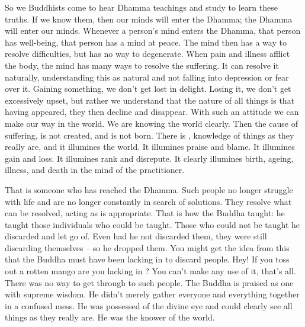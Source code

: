 So we Buddhists come to hear Dhamma teachings and study to learn these truths. If we know them, then our minds will enter the Dhamma; the Dhamma will enter our minds. Whenever a person's mind enters the Dhamma, that person has well-being, that person has a mind at peace. The mind then has a way to resolve difficulties, but has no way to degenerate. When pain and illness afflict the body, the mind has many ways to resolve the suffering. It can resolve it naturally, understanding this as natural and not falling into depression or fear over it. Gaining something, we don't get lost in delight. Losing it, we don't get excessively upset, but rather we understand that the nature of all things is that having appeared, they then decline and disappear. With such an attitude we can make our way in the world. We are  knowing the world clearly. Then  the cause of suffering, is not created, and  is not born. There is , knowledge of things as they really are, and it illumines the world. It illumines praise and blame. It illumines gain and loss. It illumines rank and disrepute. It clearly illumines birth, ageing, illness, and death in the mind of the practitioner. 

That is someone who has reached the Dhamma. Such people no longer struggle with life and are no longer constantly in search of solutions. They resolve what can be resolved, acting as is appropriate. That is how the Buddha taught: he taught those individuals who could be taught. Those who could not be taught he discarded and let go of. Even had he not discarded them, they were still discarding themselves -- so he dropped them. You might get the idea from this that the Buddha must have been lacking in  to discard people. Hey! If you toss out a rotten mango are you lacking in ? You can't make any use of it, that's all. There was no way to get through to such people. The Buddha is praised as one with supreme wisdom. He didn't merely gather everyone and everything together in a confused mess. He was possessed of the divine eye and could clearly see all things as they really are. He was the knower of the world.

